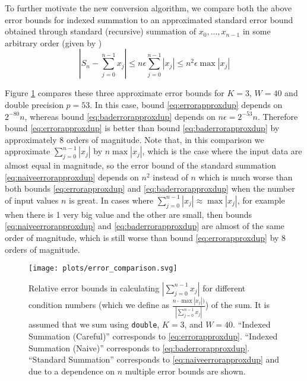     To further motivate the new conversion algorithm, we compare both the above
    error bounds for indexed summation to an approximated standard error bound
    obtained through standard (recursive) summation of $x_0, ..., x_{n - 1}$ in
    some arbitrary order (given by \cite{higham})
    \begin{equation}
      |S_n - \sum_{j=0}^{n-1}x_j| \leq n \epsilon  \sum\limits_{j = 0}^{n - 1}|x_j| \leq n^2  \epsilon  \max|x_j|
      \label{eq:naiveerrorapproxdup}
    \end{equation}

    Figure \ref{fig:conversionmotivation} compares these three approximate error bounds
    for $K=3$, $W=40$ and double precision $p=53$.
    In this case, bound \eqref{eq:errorapproxdup} depends on $2^{-80}n$,
    whereas bound \eqref{eq:baderrorapproxdup} depends on $n\epsilon = 2^{-53}n$.
    Therefore bound \eqref{eq:errorapproxdup} is better than bound \eqref{eq:baderrorapproxdup}
    by approximately 8 orders of magnitude.
    Note that, in this comparison we approximate $\sum_{j=0}^{n-1} |x_j|$ by $n \max |x_j|$,
    which is the case where the input data are almost equal in magnitude,
    so the error bound of the standard summation \eqref{eq:naiveerrorapproxdup} depends
    on $n^2$ instead of $n$ which is much worse than both bounds
    \eqref{eq:errorapproxdup} and \eqref{eq:baderrorapproxdup}
    when the number of input values $n$ is great.
    In cases where $\sum_{j=0}^{n-1} |x_j| \approx \max |x_j|$, for example
    when there is 1 very big value and the other are small, then bounds
    \eqref{eq:naiveerrorapproxdup} and \eqref{eq:baderrorapproxdup} are almost
    of the same order of magnitude, which is still worse than bound \eqref{eq:errorapproxdup}
    by 8 orders of magnitude.

\begin{figure}[H]
\begin{center}
\texttt{[image: plots/error\_comparison.svg]}
\caption{Relative error bounds in calculating $|\sum \limits_{j = 0}^{n - 1}
x_j|$ for different condition numbers (which we define as $\frac{n \cdot \max
|x_j|)}{|\sum \limits_{j = 0}^{n - 1} x_j|}$) of the sum. It is assumed that we
sum using \texttt{double}, $K = 3$, and $W = 40$. ``Indexed Summation
(Careful)'' corresponds to \eqref{eq:errorapproxdup}. ``Indexed Summation
(Naive)'' corresponds to \eqref{eq:baderrorapproxdup}. ``Standard Summation''
corresponds to \eqref{eq:naiveerrorapproxdup} and due to a dependence on $n$
multiple error bounds are shown.}
\label{fig:conversionmotivation}
\end{center}
\end{figure}

